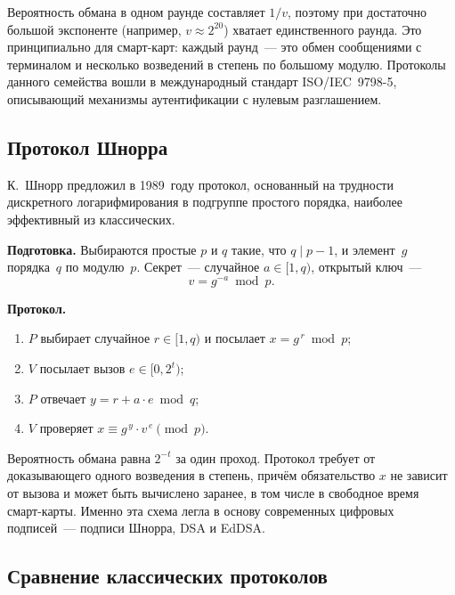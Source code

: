 \documentclass[14pt,a4paper]{extarticle}
\begin{document}
Вероятность обмана в одном раунде составляет $1/v$, поэтому при достаточно большой
экспоненте (например, $v \approx 2^{20}$) хватает единственного раунда. Это принципиально
для смарт-карт: каждый раунд~--- это обмен сообщениями с терминалом и несколько
возведений в степень по большому модулю. Протоколы данного семейства вошли в
международный стандарт ISO/IEC~9798-5, описывающий механизмы аутентификации
с нулевым разглашением.

\subsection{Протокол Шнорра}

К.~Шнорр предложил в 1989~году протокол, основанный на трудности дискретного
логарифмирования в подгруппе простого порядка, наиболее эффективный из классических.

\textbf{Подготовка.} Выбираются простые $p$ и $q$ такие, что $q \mid p - 1$, и элемент~$g$
порядка~$q$ по модулю~$p$. Секрет~--- случайное $a \in [1, q)$, открытый ключ~---
\begin{equation}
v = g^{-a} \bmod p .
\end{equation}

\textbf{Протокол.}
\begin{enumerate}
\item $P$ выбирает случайное $r \in [1, q)$ и посылает $x = g^{\,r} \bmod p$;
\item $V$ посылает вызов $e \in [0, 2^{t})$;
\item $P$ отвечает $y = r + a \cdot e \bmod q$;
\item $V$ проверяет $x \equiv g^{\,y} \cdot v^{\,e} \pmod p$.
\end{enumerate}

Вероятность обмана равна $2^{-t}$ за один проход. Протокол требует от доказывающего
одного возведения в степень, причём обязательство $x$ не зависит от вызова и может быть
вычислено заранее, в том числе в свободное время смарт-карты. Именно эта схема легла в
основу современных цифровых подписей~--- подписи Шнорра, DSA и EdDSA.

\subsection{Сравнение классических протоколов}
\end{document}
